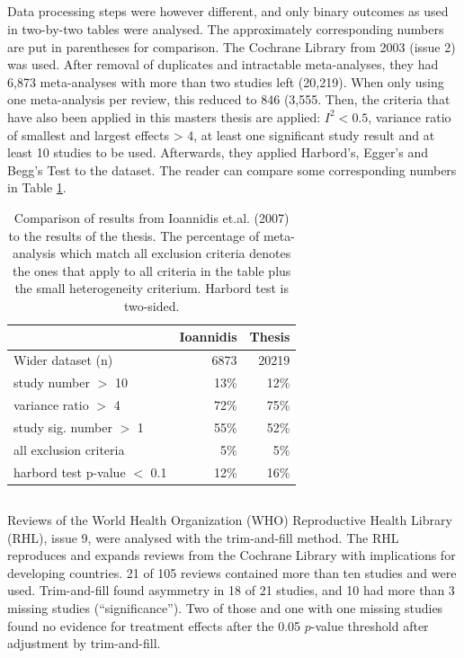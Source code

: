 \documentclass[11pt,a4paper,twoside]{book}\usepackage[]{graphicx}\usepackage[]{color}
\begin{document}
\subsection{\citet{Ioannidis2007}}
Data processing steps were however different, and only binary outcomes as used in two-by-two tables were analysed. The approximately corresponding numbers are put in parentheses for comparison. The Cochrane Library from 2003 (issue 2) was used. After removal of duplicates and intractable meta-analyses, they had 6,873 meta-analyses with more than two studies left (20,219). When only using one meta-analysis per review, this reduced to 846 (3,555. Then, the criteria that have also been applied in this masters thesis are applied: $I^2 < 0.5$, variance ratio of smallest and largest effects > 4, at least one significant study result and at least 10 studies to be used. Afterwards, they applied Harbord's, Egger's and Begg's Test to the dataset. The reader can compare some corresponding numbers in Table \ref{ioannidis}.

\begin{table}[ht]
\centering
\begin{tabular}{lrr}
  \hline
 & Ioannidis & Thesis \\ 
  \hline
Wider dataset (n) & 6873 & 20219 \\ 
  study number $>$ 10 & 13\% & 12\% \\ 
  variance ratio $>$ 4 & 72\% & 75\% \\ 
  study sig. number $>$ 1 & 55\% & 52\% \\ 
  all exclusion criteria & 5\% & 5\% \\ 
  harbord test p-value $<$ 0.1 & 12\% & 16\% \\ 
   \hline
\end{tabular}
\caption{Comparison of results from Ioannidis et.al. (2007) to the results of the thesis. The percentage of meta-analysis which match all exclusion criteria denotes the ones that apply to all criteria in the table plus the small heterogeneity criterium. Harbord test is two-sided.} 
\label{ioannidis}
\end{table}


\subsection{\citet{souza.2007}}
Reviews of the World Health Organization (WHO) Reproductive Health Library (RHL), issue 9, were analysed with the trim-and-fill method. The RHL reproduces and expands reviews from the Cochrane Library with implications for developing countries. 21 of 105 reviews contained more than ten studies and were used. Trim-and-fill found asymmetry in 18 of 21 studies, and 10 had more than 3 missing studies (``significance''). Two of those and one with one missing studies found no evidence for treatment effects after the 0.05 $p$-value threshold after adjustment by trim-and-fill.
\end{document}
